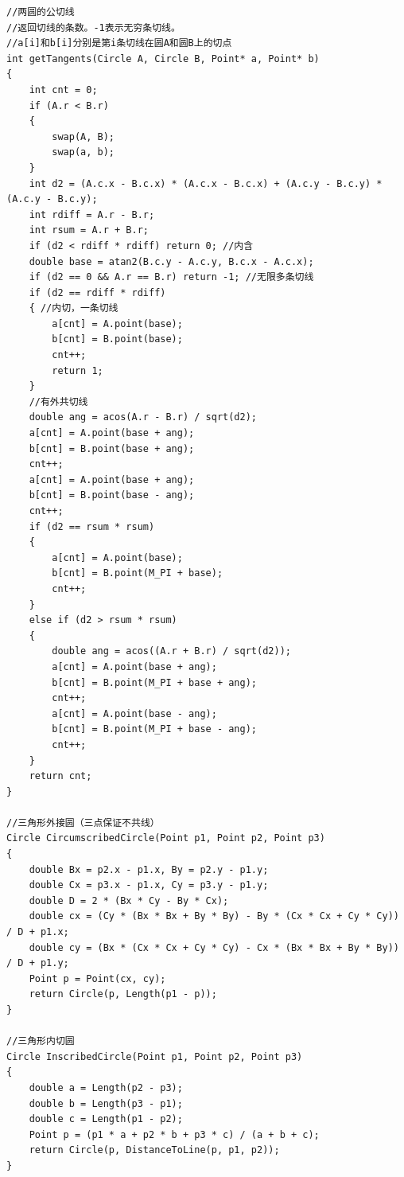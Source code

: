 \documentclass[twoside]{article}
\begin{document}
\begin{lstlisting}
//两圆的公切线
//返回切线的条数。-1表示无穷条切线。
//a[i]和b[i]分别是第i条切线在圆A和圆B上的切点
int getTangents(Circle A, Circle B, Point* a, Point* b)
{
    int cnt = 0;
    if (A.r < B.r)
    {
        swap(A, B);
        swap(a, b);
    }
    int d2 = (A.c.x - B.c.x) * (A.c.x - B.c.x) + (A.c.y - B.c.y) * (A.c.y - B.c.y);
    int rdiff = A.r - B.r;
    int rsum = A.r + B.r;
    if (d2 < rdiff * rdiff) return 0; //内含
    double base = atan2(B.c.y - A.c.y, B.c.x - A.c.x);
    if (d2 == 0 && A.r == B.r) return -1; //无限多条切线
    if (d2 == rdiff * rdiff)
    { //内切，一条切线
        a[cnt] = A.point(base);
        b[cnt] = B.point(base);
        cnt++;
        return 1;
    }
    //有外共切线
    double ang = acos(A.r - B.r) / sqrt(d2);
    a[cnt] = A.point(base + ang);
    b[cnt] = B.point(base + ang);
    cnt++;
    a[cnt] = A.point(base + ang);
    b[cnt] = B.point(base - ang);
    cnt++;
    if (d2 == rsum * rsum)
    {
        a[cnt] = A.point(base);
        b[cnt] = B.point(M_PI + base);
        cnt++;
    }
    else if (d2 > rsum * rsum)
    {
        double ang = acos((A.r + B.r) / sqrt(d2));
        a[cnt] = A.point(base + ang);
        b[cnt] = B.point(M_PI + base + ang);
        cnt++;
        a[cnt] = A.point(base - ang);
        b[cnt] = B.point(M_PI + base - ang);
        cnt++;
    }
    return cnt;
}

//三角形外接圆（三点保证不共线）
Circle CircumscribedCircle(Point p1, Point p2, Point p3)
{
    double Bx = p2.x - p1.x, By = p2.y - p1.y;
    double Cx = p3.x - p1.x, Cy = p3.y - p1.y;
    double D = 2 * (Bx * Cy - By * Cx);
    double cx = (Cy * (Bx * Bx + By * By) - By * (Cx * Cx + Cy * Cy)) / D + p1.x;
    double cy = (Bx * (Cx * Cx + Cy * Cy) - Cx * (Bx * Bx + By * By)) / D + p1.y;
    Point p = Point(cx, cy);
    return Circle(p, Length(p1 - p));
}

//三角形内切圆
Circle InscribedCircle(Point p1, Point p2, Point p3)
{
    double a = Length(p2 - p3);
    double b = Length(p3 - p1);
    double c = Length(p1 - p2);
    Point p = (p1 * a + p2 * b + p3 * c) / (a + b + c);
    return Circle(p, DistanceToLine(p, p1, p2));
}
\end{lstlisting}
\end{document}
